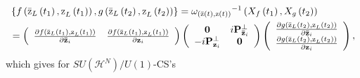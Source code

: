 \documentclass[aps,preprint]{revtex4}%
\begin{document}
\begin{align}
&  \left\{  f\left(  \mathrm{\bar{z}}_{L}\left(  t_{1}\right)  \mathrm{,z}%
_{L}\left(  t_{1}\right)  \right)  ,g\left(  \mathrm{\bar{z}}_{L}\left(
t_{2}\right)  \mathrm{,z}_{L}\left(  t_{2}\right)  \right)  \right\}
=\omega_{\left(  \mathrm{\bar{z}}\left(  t\right)  \mathrm{,z}\left(
t\right)  \right)  }{}^{-1}\left(  X_{f}\left(  t_{1}\right)  ,X_{g}\left(
t_{2}\right)  \right) \nonumber\\
&  =\left(
\begin{array}
[c]{cc}%
\frac{\partial f\left(  \mathrm{\bar{z}}_{L}\left(  t_{1}\right)
\mathrm{,z}_{L}\left(  t_{1}\right)  \right)  }{\partial\mathbf{\bar{z}}_{i}}
& \frac{\partial f\left(  \mathrm{\bar{z}}_{L}\left(  t_{1}\right)
\mathrm{,z}_{L}\left(  t_{1}\right)  \right)  }{\partial\mathbf{z}_{i}}%
\end{array}
\right)  \left(
\begin{array}
[c]{cc}%
\mathbf{0} & i\mathbf{P}_{\mathbf{\bar{z}}_{i}}^{\bot}\\
-i\mathbf{P}_{\mathbf{z}_{i}}^{\bot} & \mathbf{0}%
\end{array}
\right)  \left(
\begin{array}
[c]{c}%
\frac{\partial g\left(  \mathrm{\bar{z}}_{L}\left(  t_{2}\right)
\mathrm{,z}_{L}\left(  t_{2}\right)  \right)  }{\partial\mathbf{\bar{z}}_{i}%
}\\
\frac{\partial g\left(  \mathrm{\bar{z}}_{L}\left(  t_{2}\right)
\mathrm{,z}_{L}\left(  t_{2}\right)  \right)  }{\partial\mathbf{z}_{i}}%
\end{array}
\right)  ,
\end{align}
which gives for $SU\left(  \mathcal{H}^{N}\right)  /U\left(  1\right)  $-CS's%
\end{document}
